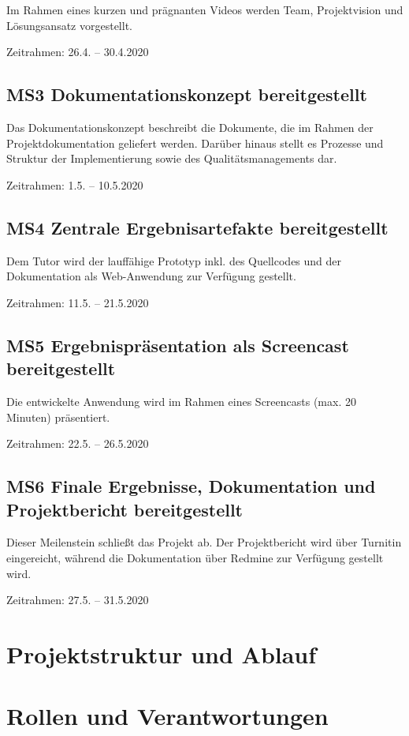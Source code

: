 \documentclass[a4paper,11pt,listof=numbered,glossary=totoc,parskip=half,toc=bib]{scrreprt}
\begin{document}
Im Rahmen eines kurzen und prägnanten Videos werden Team, Projektvision und Lösungsansatz vorgestellt.

Zeitrahmen: 26.4. -- 30.4.2020

\subsection{MS3 Dokumentationskonzept bereitgestellt}

Das Dokumentationskonzept beschreibt die Dokumente, die im Rahmen der Projektdokumentation geliefert werden. Darüber hinaus stellt es Prozesse und Struktur der Implementierung sowie des Qualitätsmanagements dar.

Zeitrahmen: 1.5. -- 10.5.2020

\subsection{MS4 Zentrale Ergebnisartefakte bereitgestellt}

Dem Tutor wird der lauffähige Prototyp inkl. des Quellcodes und der Dokumentation als Web-Anwendung zur Verfügung gestellt.

Zeitrahmen: 11.5. -- 21.5.2020

\subsection{MS5 Ergebnispräsentation als Screencast bereitgestellt}

Die entwickelte Anwendung wird im Rahmen eines Screencasts (max. 20 Minuten) präsentiert.

Zeitrahmen: 22.5. -- 26.5.2020

\subsection{MS6 Finale Ergebnisse, Dokumentation und Projektbericht bereitgestellt}

Dieser Meilenstein schließt das Projekt ab. Der Projektbericht wird über Turnitin eingereicht, während die Dokumentation über Redmine zur Verfügung gestellt wird.

Zeitrahmen: 27.5. -- 31.5.2020

	\newpage
	\section{Projektstruktur und Ablauf}

	\newpage
	\section{Rollen und Verantwortungen}	
\end{document}
